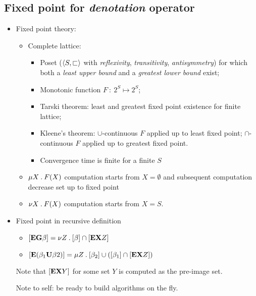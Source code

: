 \subsection{Fixed point for \emph{denotation} operator}
\begin{itemize}
\item   Fixed point theory:

    \begin{itemize}

    \item   Complete lattice:

        \begin{itemize}

        \item   Poset ($\left<{S, \sqsubset}\right>$ with \emph{reflexivity},
                \emph{transitivity}, \emph{antisymmetry}) for which both a
                \emph{least upper bound} and a \emph{greatest lower bound}
                exist;

        \item   Monotonic function $F \::\: 2^S \mapsto 2^S$;

        \item   Tarski theorem: least and greatest fixed point
                existence for finite lattice;

        \item   Kleene's theorem: $\cup$-continuous $F$ applied up to
                least fixed point; $\cap$-continuous $F$ applied up to
                greatest fixed point.

        \item   Convergence time is finite for a finite $S$

        \end{itemize}

    \item   $\mu{X}\:.\:{F(X)}$ computation starts from $X = \emptyset$ and
            subsequent computation decrease set up to fixed point

    \item   $\nu{X}\:.\:{F(X)}$ computation starts from $X = S$.

    \end{itemize}

\item   Fixed point in recursive definition

    \begin{itemize}

    \item   $\left[{\mathcal{\mathcal{\sf \bf E}}\mathcal{\sf \bf G}\beta}\right] =
                \nu{Z}\:.\:{\left[{\beta}\right] \cap \left[{\mathcal{\mathcal{\sf \bf E}}\mathcal{\sf \bf X}Z}\right]}$
    \item   $\left[{\mathcal{\mathcal{\sf \bf E}}({\beta_1}\mathcal{\sf \bf U}{\beta2})}\right] =
                \mu{Z}\:.\:{\left[{\beta_2}\right] \cup (\left[{\beta_1}\right] \cap
                          \left[{\mathcal{\mathcal{\sf \bf E}}\mathcal{\sf \bf X}Z}\right])}$

    \end{itemize}
    Note that $\left[{\mathcal{\mathcal{\sf \bf E}}\mathcal{\sf \bf X}Y}\right]$ for some set $Y$ is computed as the
    pre-image set.

    Note to self: be ready to build algorithms on the fly.

\end{itemize}
